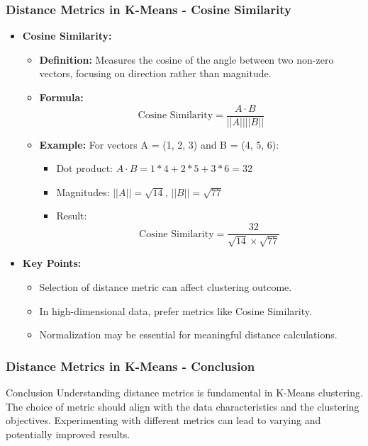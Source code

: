 \documentclass[aspectratio=169]{beamer}
\begin{document}
\begin{frame}[fragile]
    \frametitle{Distance Metrics in K-Means - Cosine Similarity}
    \begin{itemize}
        \item \textbf{Cosine Similarity:}
        \begin{itemize}
            \item \textbf{Definition:} Measures the cosine of the angle between two non-zero vectors, focusing on direction rather than magnitude.
            \item \textbf{Formula:}
            \begin{equation}
            \text{Cosine Similarity} = \frac{A \cdot B}{||A|| ||B||}
            \end{equation}
            \item \textbf{Example:} For vectors A = (1, 2, 3) and B = (4, 5, 6):
            \begin{itemize}
                \item Dot product: \( A \cdot B = 1*4 + 2*5 + 3*6 = 32 \)
                \item Magnitudes: \( ||A|| = \sqrt{14}, \, ||B|| = \sqrt{77} \)
                \item Result: 
                \begin{equation}
                \text{Cosine Similarity} = \frac{32}{\sqrt{14} \times \sqrt{77}}
                \end{equation}
            \end{itemize}
        \end{itemize}
        
        \item \textbf{Key Points:}
        \begin{itemize}
            \item Selection of distance metric can affect clustering outcome.
            \item In high-dimensional data, prefer metrics like Cosine Similarity.
            \item Normalization may be essential for meaningful distance calculations.
        \end{itemize}
    \end{itemize}
\end{frame}

\begin{frame}[fragile]
    \frametitle{Distance Metrics in K-Means - Conclusion}
    \begin{block}{Conclusion}
        Understanding distance metrics is fundamental in K-Means clustering. The choice of metric should align with the data characteristics and the clustering objectives. Experimenting with different metrics can lead to varying and potentially improved results.
    \end{block}
\end{frame}
\end{document}
